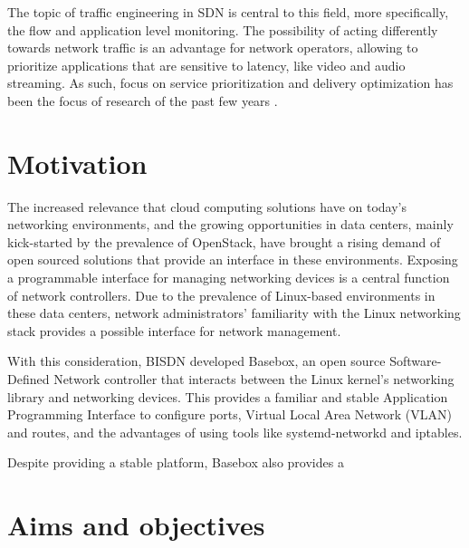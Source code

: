 \par The topic of traffic engineering in SDN is central to this field, more specifically, the flow and application level monitoring.  The possibility of acting
differently towards network traffic is an advantage for network operators, allowing to prioritize applications that are
sensitive to latency, like video and audio streaming. As such, focus on service prioritization and delivery optimization has been the focus of research 
of the past few years \cite{bakhshi_user-centric_2017}.

\section {Motivation}


The increased relevance that cloud computing solutions have on today's networking environments, and the growing opportunities in data centers, mainly
kick-started by the prevalence of OpenStack, have brought a rising demand of open sourced solutions that provide an interface in these environments. Exposing
a programmable interface for managing networking devices is a central function of network controllers. Due to the prevalence of Linux-based environments in these
data centers, network administrators' familiarity with the Linux networking stack provides a possible interface for network management.

\par With this consideration, BISDN developed Basebox, an open source Software-Defined Network controller that interacts between the Linux kernel's networking
library and networking devices. This provides a familiar and stable Application Programming Interface to configure ports, Virtual Local Area Network (VLAN) 
and routes, and the advantages of using tools like systemd-networkd and iptables.

\par Despite providing a stable platform, Basebox also provides a 

\section {Aims and objectives}


